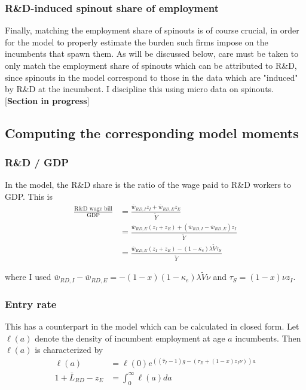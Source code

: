 \documentclass[11pt,english]{article}
\theoremstyle{remark}
\begin{document}
\subsubsection{R\&D-induced spinout share of employment}

Finally, matching the employment share of spinouts is of course crucial, in order for the model to properly estimate the burden such firms impose on the incumbents that spawn them. As will be discussed below, care must be taken to only match the employment share of spinouts which can be attributed to R\&D, since spinouts in the model correspond to those in the data which are "induced" by R\&D at the incumbent. I discipline this using micro data on spinouts. [\textbf{Section in progress}]

\subsection{Computing the corresponding model moments}

\subsubsection{R\&D / GDP} 

In the model, the R\&D share is the ratio of the wage paid to R\&D workers to GDP. This is
\begin{align*}
\frac{\textrm{R\&D wage bill}}{\textrm{GDP}} &= \frac{\overline{w}_{RD,I} z_I + \overline{w}_{RD,E} z_E}{\tilde{Y}} \\ 
&= \frac{\overline{w}_{RD,E} (z_I + z_E) + (\overline{w}_{RD,I} - \overline{w}_{RD,E})z_I}{\tilde{Y}} \\
&= \frac{\overline{w}_{RD,E} (z_I + z_E) - (1-\kappa_e) \lambda \tilde{V} \tau_S}{\tilde{Y}}
\end{align*}

where I used $\overline{w}_{RD,I} - \overline{w}_{RD,E} = -(1-x)(1-\kappa_e) \lambda \tilde{V} \nu$ and $\tau_S = (1-x)\nu z_I$. 

\subsubsection{Entry rate}

This has a counterpart in the model which can be calculated in closed form. Let $\ell(a)$ denote the density of incumbent employment at age $a$ incumbents. Then $\ell(a)$ is characterized by 
\begin{align*}
\ell(a) &= \ell(0)e^{((\hat{\tau}_I -1)g - (\tau_E + (1-x)z_I \nu))a}  \\
1 + \bar{L}_{RD} - z_E &= \int_0^{\infty} \ell(a) da
\end{align*}
\end{document}
